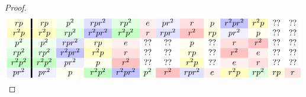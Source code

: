 \documentclass{ximera}
\begin{document}
\begin{example}
\begin{proof}
\begin{gather*}
\begin{array}{c!{\vline width 2pt}cccccccccccc}
      r p \cellcolor{yellow!12!white}   & rp \cellcolor{yellow!12!white}   & p^2 \cellcolor{green!6!white}   & rpr^2 \cellcolor{blue!12!white}    & rp^2\cellcolor{green!12!white}   & e\cellcolor{red!6!white}     & pr^2\cellcolor{blue!6!white}  & r\cellcolor{red!12!white}  &  p \cellcolor{yellow!6!white}  & r^2pr^2\cellcolor{blue!24!white} & r^2p \cellcolor{yellow!24!white}  &  ??\cellcolor{white}  & ?? \cellcolor{white}  \\  
      r^2 p\cellcolor{yellow!24!white}  & r^2 p\cellcolor{yellow!24!white} & rp^2 \cellcolor{green!12!white}    & r^2 pr^2\cellcolor{blue!24!white}   & r^2p^2\cellcolor{green!24!white}    & r\cellcolor{red!12!white}   & rpr^2\cellcolor{blue!12!white} & r^2\cellcolor{red!24!white} &  rp \cellcolor{yellow!12!white}  &  pr^2 \cellcolor{blue!6!white}  & p \cellcolor{yellow!6!white}  &  ?? \cellcolor{white}  & ?? \cellcolor{white}    \\
      p^2\cellcolor{green!6!white}      & p^2\cellcolor{green!6!white} & rpr^2 \cellcolor{blue!12!white} & rp \cellcolor{yellow!12!white} & e\cellcolor{red!6!white} &  ?? \cellcolor{white}  &  ?? \cellcolor{white} &  p \cellcolor{yellow!6!white}  & ?? \cellcolor{white}  & r \cellcolor{red!12!white}   & r^2\cellcolor{red!24!white} &  ?? \cellcolor{white}  & ?? \cellcolor{white}\\
      rp^2\cellcolor{green!12!white}    & rp^2\cellcolor{green!12!white} & r^2pr^2\cellcolor{blue!24!white} & r^2p \cellcolor{yellow!24!white} & r\cellcolor{red!12!white}&  ?? \cellcolor{white}  &  ?? \cellcolor{white} &  rp \cellcolor{yellow!12!white}  & ?? \cellcolor{white}  & r^2 \cellcolor{red!24!white}   & e\cellcolor{red!6!white} &  ?? \cellcolor{white}  & ?? \cellcolor{white}\\
      r^2p^2\cellcolor{green!24!white}  & r^2p^2\cellcolor{green!24!white}& pr^2 \cellcolor{blue!6!white} & p\cellcolor{yellow!6!white} & r^2\cellcolor{red!24!white}&  ?? \cellcolor{white}  &  ?? \cellcolor{white} &  r^2p \cellcolor{yellow!24!white}  & ?? \cellcolor{white}  & e \cellcolor{red!6!white}   & r\cellcolor{red!12!white} &  ?? \cellcolor{white}  & ?? \cellcolor{white}\\
      pr^2\cellcolor{blue!6!white}      & pr^2\cellcolor{blue!6!white} & p\cellcolor{yellow!6!white} & r^2p^2 \cellcolor{green!24!white} & r^2pr^2\cellcolor{blue!24!white}& p^2\cellcolor{green!6!white}& r^2\cellcolor{red!24!white} & rpr^2\cellcolor{blue!12!white} & e\cellcolor{red!6!white}  &  r^2p \cellcolor{yellow!24!white}  & rp^2 \cellcolor{green!12!white}  & rp \cellcolor{yellow!12!white}  & r \cellcolor{red!12!white}\\

\end{array}
\end{gather*}
\end{proof}
\end{example}
\end{document}
